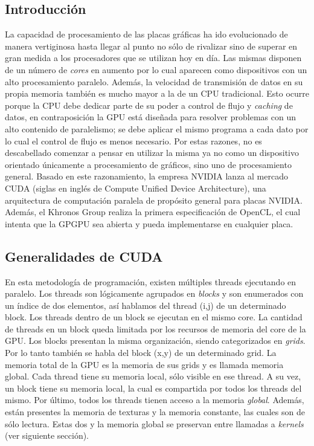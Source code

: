 \subsection{Introducci\'on}
La capacidad de procesamiento de las placas gr\'aficas ha ido evolucionado de manera vertiginosa hasta llegar al punto no s\'olo de rivalizar sino de superar en gran medida a los procesadores que se utilizan hoy en d\'ia.
Las mismas disponen de un n\'umero de {\em cores} en aumento por lo cual aparecen como dispositivos con un alto procesamiento paralelo.
Adem\'as, la velocidad de transmisi\'on de datos en su propia memoria tambi\'en es mucho mayor a la de un CPU tradicional.
Esto ocurre porque la CPU debe dedicar parte de su poder a control de flujo y {\em caching} de datos, en contraposici\'on la GPU est\'a dise\~nada para resolver problemas con un alto contenido de paralelismo; se debe aplicar el mismo programa a cada dato por lo cual el control de flujo es menos necesario.
Por estas razones, no es descabellado comenzar a pensar en utilizar la misma ya no como un dispositivo orientado \'unicamente a procesamiento de gr\'aficos, sino uno de procesamiento general.
Basado en este razonamiento, la empresa NVIDIA lanza al mercado CUDA (siglas en ingl\'es de Compute Unified Device Architecture), una arquitectura de computaci\'on paralela de prop\'osito general para placas NVIDIA.
Además, el Khronos Group realiza la primera especificación de OpenCL, el cual intenta que la GPGPU sea abierta y pueda implementarse en cualquier placa.


\subsection{Generalidades de CUDA}
En esta metodolog\'ia de programaci\'on, existen m\'ultiples threads ejecutando en paralelo.
Los threads son l\'ogicamente agrupados en {\em blocks} y son enumerados con un \'indice de dos elementos, as\'i hablamos del thread (i,j) de un determinado block.
Los threads dentro de un block se ejecutan en el mismo core.
La cantidad de threads en un block queda limitada por los recursos de memoria del core de la GPU. Los blocks presentan la misma organizaci\'on, siendo categorizados en {\em grids}. 
Por lo tanto tambi\'en se habla del block (x,y) de un determinado grid.
La memoria total de la GPU es la memoria de sus grids y es llamada memoria global. Cada thread tiene su memoria local, s\'olo visible en ese thread.
A su vez, un block tiene su memoria local, la cual es compartida por todos los threads del mismo.
Por \'ultimo, todos los threads tienen acceso a la memoria {\em global}.
Adem\'as, est\'an presentes la memoria de texturas y la memoria constante, las cuales son de s\'olo lectura.
Estas dos y la memoria global se preservan entre llamadas a {\em kernels} (ver siguiente secci\'on).


